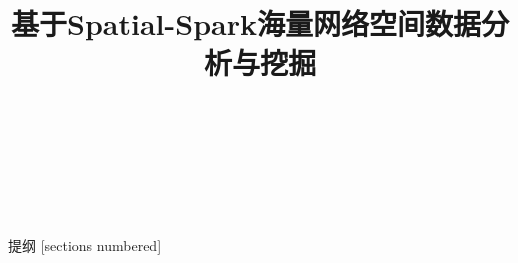 \documentclass{beamer}
\title{基于Spatial-Spark海量网络空间数据分析与挖掘}
\author[高峰]{
    \makebox[2.5em][s]{姓名:} \makebox[3em][s]{高峰}\\
    \makebox[2.5em][s]{导师:} \makebox[3em][s]{高井祥} \\
    \makebox[2.5em][s]{} \makebox[3em]{孙久运} \\
    \makebox[2.5em][s]{专业:} \makebox[10em][l]{大地测量学与测量工程}\\
}
\date{}
\begin{document}
\maketitle

\begin{frame}{提纲}
  [sections numbered]
  \tableofcontents[hideallsubsections]
\end{frame}



        




\end{document}
